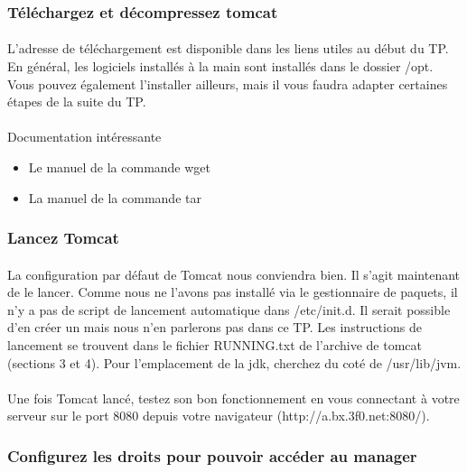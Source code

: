 \documentclass[12pt,a4paper]{article}
\begin{document}
\subsubsection{Téléchargez et décompressez tomcat}
\paragraph{}
L'adresse de téléchargement est disponible dans les liens utiles au début du TP. En général, les logiciels installés à la main sont installés dans le dossier /opt. Vous pouvez également l'installer ailleurs, mais il vous faudra adapter certaines étapes de la suite du TP.

\paragraph{}
Documentation intéressante
\begin{itemize}
\item Le manuel de la commande wget
\item La manuel de la commande tar
\end{itemize}

\subsubsection{Lancez Tomcat}
\paragraph{}
La configuration par défaut de Tomcat nous conviendra bien. Il s'agit maintenant de le lancer. Comme nous ne l'avons pas installé via le gestionnaire de paquets, il n'y a pas de script de lancement automatique dans /etc/init.d. Il serait possible d'en créer un mais nous n'en parlerons pas dans ce TP. Les instructions de lancement se trouvent dans le fichier RUNNING.txt de l'archive de tomcat (sections 3 et 4). Pour l'emplacement de la jdk, cherchez du coté de /usr/lib/jvm.

\paragraph{}
Une fois Tomcat lancé, testez son bon fonctionnement en vous connectant à votre serveur sur le port 8080 depuis votre navigateur (http://a.bx.3f0.net:8080/).

\subsubsection{Configurez les droits pour pouvoir accéder au manager}
\end{document}
